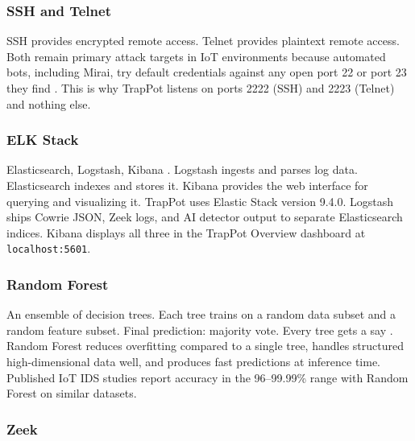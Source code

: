 \subsubsection{SSH and Telnet}
\label{subsub:ssh_telnet}

SSH provides encrypted remote access. Telnet provides plaintext remote access. Both remain primary attack targets in IoT environments because automated bots, including Mirai, try default credentials against any open port 22 or port 23 they find \cite{9558948,203628}. This is why TrapPot listens on ports 2222 (SSH) and 2223 (Telnet) and nothing else.

\subsubsection{ELK Stack}
\label{subsub:elk_stack}

Elasticsearch, Logstash, Kibana \cite{9001068}. Logstash ingests and parses log data. Elasticsearch indexes and stores it. Kibana provides the web interface for querying and visualizing it. TrapPot uses Elastic Stack version 9.4.0. Logstash ships Cowrie JSON, Zeek logs, and AI detector output to separate Elasticsearch indices. Kibana displays all three in the TrapPot Overview dashboard at \texttt{localhost:5601}.

\subsubsection{Random Forest}
\label{subsub:random_forest}

An ensemble of decision trees. Each tree trains on a random data subset and a random feature subset. Final prediction: majority vote. Every tree gets a say \cite{lee2021classification,saied2023comparative}. Random Forest reduces overfitting compared to a single tree, handles structured high-dimensional data well, and produces fast predictions at inference time. Published IoT IDS studies report accuracy in the 96–99.99\% range with Random Forest on similar datasets.

\subsubsection{Zeek}
\label{subsub:Zeek}

